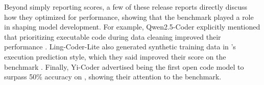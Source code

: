 Beyond simply reporting scores, a few of these release reports directly discuss
how they optimized for \benchmark{} performance, showing that the benchmark played a role
in shaping model development. For example, Qwen2.5-Coder explicitly mentioned that prioritizing executable
code during data cleaning improved their \benchmark{} performance \citep{qwen2024qwen25coder}.
Ling-Coder-Lite also generated synthetic training data in \benchmark{}'s execution prediction style, which
they said improved their score on the benchmark \citep{codefuse2025lingcoderlite}. Finally, Yi-Coder advertised
being the first open code model to surpass 50\% accuracy on \benchmarko{}
\citep{yi2024yicoder}, showing their attention to the benchmark.
